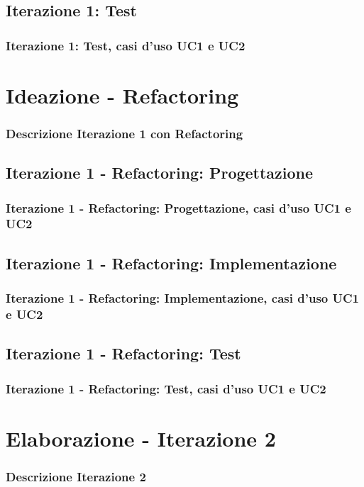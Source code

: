 \documentclass[t]{beamer} %
\begin{document}
\subsection{Iterazione 1: Test}
\begin{frame}
 \frametitle{Iterazione 1: Test, casi d'uso UC1 e UC2}
\end{frame}

\section{Ideazione - Refactoring}
\begin{frame}
  \frametitle{Descrizione Iterazione 1 con Refactoring}
\end{frame}

\subsection{Iterazione 1 - Refactoring: Progettazione}
\begin{frame}
  \frametitle{Iterazione 1 - Refactoring: Progettazione, casi d'uso UC1 e UC2}
\end{frame}

\subsection{Iterazione 1 - Refactoring: Implementazione}
\begin{frame}
  \frametitle{Iterazione 1 - Refactoring: Implementazione, casi d'uso UC1 e UC2}
\end{frame}

\subsection{Iterazione 1 - Refactoring: Test}
\begin{frame}
  \frametitle{Iterazione 1 - Refactoring: Test, casi d'uso UC1 e UC2}
\end{frame}

\section{Elaborazione - Iterazione 2}
\begin{frame}
  \frametitle{Descrizione Iterazione 2}
\end{frame}
\end{document}
